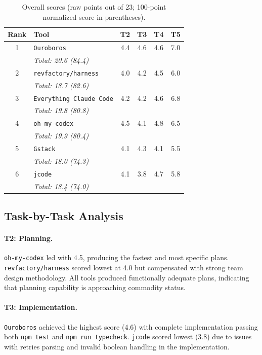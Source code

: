 \documentclass[11pt,a4paper]{article}
\newcommand{\tool}[1]{\texttt{#1}}
\begin{document}
\begin{table}[t]
\centering
\caption{Overall scores (raw points out of 23; 100-point normalized score in parentheses).}
\label{tab:overall}
\small
\begin{tabular}{@{}clcccc@{}}
\toprule
\textbf{Rank} & \textbf{Tool} & \textbf{T2} & \textbf{T3} & \textbf{T4} & \textbf{T5} \\
\midrule
1 & \tool{Ouroboros} & 4.4 & 4.6 & 4.6 & 7.0 \\
  & \emph{Total: 20.6 (84.4)} & & & & \\
2 & \tool{revfactory/harness} & 4.0 & 4.2 & 4.5 & 6.0 \\
  & \emph{Total: 18.7 (82.6)} & & & & \\
3 & \tool{Everything Claude Code} & 4.2 & 4.2 & 4.6 & 6.8 \\
  & \emph{Total: 19.8 (80.8)} & & & & \\
4 & \tool{oh-my-codex} & 4.5 & 4.1 & 4.8 & 6.5 \\
  & \emph{Total: 19.9 (80.4)} & & & & \\
5 & \tool{Gstack} & 4.1 & 4.3 & 4.1 & 5.5 \\
  & \emph{Total: 18.0 (74.3)} & & & & \\
6 & \tool{jcode} & 4.1 & 3.8 & 4.7 & 5.8 \\
  & \emph{Total: 18.4 (74.0)} & & & & \\
\bottomrule
\end{tabular}
\end{table}

\subsection{Task-by-Task Analysis}

\paragraph{T2: Planning.}
\tool{oh-my-codex} led with 4.5, producing the fastest and most specific plans.
\tool{revfactory/harness} scored lowest at 4.0 but compensated with strong team design methodology.
All tools produced functionally adequate plans, indicating that planning capability is approaching commodity status.

\paragraph{T3: Implementation.}
\tool{Ouroboros} achieved the highest score (4.6) with complete implementation passing both \texttt{npm test} and \texttt{npm run typecheck}.
\tool{jcode} scored lowest (3.8) due to issues with retries parsing and invalid boolean handling in the implementation.
\end{document}
